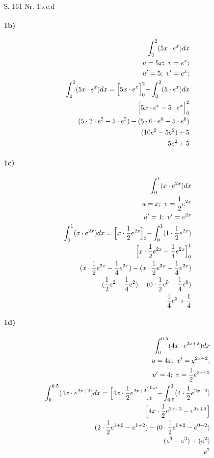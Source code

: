 \documentclass[12pt,a4paper]{report}
\begin{document}
	\noindent
	\Large
	S. 161 Nr. 1b,c,d
	\large
	\paragraph{1b)}
	\begin{align*}
		\int_{0}^{2} (5x \cdot e^x) dx \\
		u = 5x;\ v = e^x; \\
		u' = 5;\ v' = e^x; \\
		\int_{0}^{2} (5x \cdot e^x)dx = \Bigl[5x \cdot e^x\Bigl]_{0}^{2} - \int_{0}^{2} (5 \cdot e^x) dx \\
		\Bigl[5x \cdot e^x - 5 \cdot e^x\Bigl]_{0}^{2} \\
		(5 \cdot 2 \cdot e^2 - 5 \cdot e^2) -
		(5 \cdot 0 \cdot e^0 - 5 \cdot e^0) \\
		(10e^2 - 5e^2) + 5 \\
		5e^2 + 5
	\end{align*}
	\paragraph{1c)}
	\begin{align*}
		\int_{0}^{1} (x \cdot e^{2x}) dx \\
		u = x;\ v = \frac{1}{2}e^{2x} \\
		u' = 1;\ v' = e^{2x} \\
		\int_{0}^{1} (x \cdot e^{2x})dx = \Bigl[x \cdot \frac{1}{2}e^{2x}\Bigl]_{0}^{1} - \int_{0}^{1} (1 \cdot \frac{1}{2}e^{2x}) \\
		\Bigl[x \cdot \frac{1}{2}e^{2x} - \frac{1}{4}e^{2x}\Bigl]_{0}^{1} \\
		(x \cdot \frac{1}{2}e^{2x} - \frac{1}{4}e^{2x}) - (x \cdot \frac{1}{2}e^{2x} - \frac{1}{4}e^{2x}) \\
		(\frac{1}{2}e^{2} - \frac{1}{4}e^{2}) - (0 \cdot \frac{1}{2}e^{0} - \frac{1}{4}e^{0}) \\
		\frac{1}{4}e^{2} + \frac{1}{4}
	\end{align*}
	\paragraph{1d)}
	\begin{align*}
		\int_{0}^{0.5}(4x \cdot e^{2x + 2}) dx \\
		u = 4x;\ v' = e^{2x + 2}; \\
		u' = 4;\ v = \frac{1}{2}e^{2x+2} \\
		\int_{0}^{0.5} (4x \cdot e^{2x+2})dx = \Bigl[4x \cdot \frac{1}{2}e^{2x+2}\Bigl]_{0}^{0.5} - \int_{0.5}^{0} (4 \cdot \frac{1}{2}e^{2x +2}) \\
		\Bigl[4x \cdot \frac{1}{2}e^{2x+2} - e^{2x+2}\Bigl] \\
		(2 \cdot \frac{1}{2}e^{1+2} - e^{1+2}) - (0 \cdot \frac{1}{2}e^{0+2} - e^{0+2}) \\	
		(e^{3} - e^{3}) + (e^{2}) \\
		e^2
	\end{align*}
\end{document}
